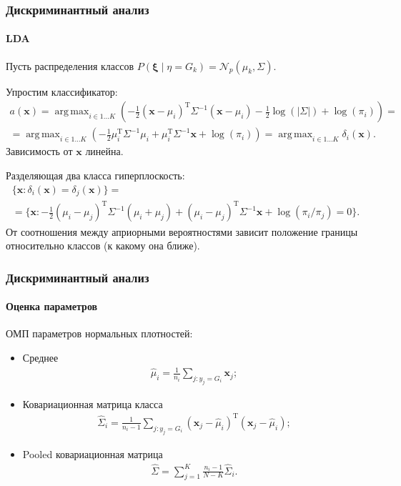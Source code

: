 \documentclass{beamer}
\DeclareMathOperator*{\argmax}{arg\,max}
\begin{document}
\begin{frame}
  \frametitle{Дискриминантный анализ}
  \framesubtitle{LDA}
  Пусть распределения классов $P(\boldsymbol{\xi} \mid \eta = G_k) = \mathcal{N}_p(\mu_k, \Sigma)$.

  Упростим классификатор:
  \begin{multline*}
    a(\mathbf{x})
    = \argmax_{i \in 1 \ldots K}(-\frac{1}{2}(\mathbf{x} - \mu_i)^\mathrm{T} \Sigma^{-1}(\mathbf{x} - \mu_i) - \frac{1}{2}\log(\lvert \Sigma \rvert) + \log(\pi_i)) = \\
    = \argmax_{i \in 1 \ldots K}(-\frac{1}{2} \mu_i^\mathrm{T} \Sigma^{-1}\mu_i + \mu_i^\mathrm{T} \Sigma^{-1}\mathbf{x} + \log(\pi_i)) =  \argmax_{i \in 1 \ldots K} \delta_i(\mathbf{x}).
  \end{multline*}
  Зависимость от $\mathbf{x}$ линейна.

  Разделяющая два класса гиперплоскость:
  \begin{multline*}
    \{\mathbf{x} : \delta_i(\mathbf{x}) = \delta_j(\mathbf{x})\} =\\ = \{\mathbf{x} : -\frac{1}{2} (\mu_i - \mu_j)^\mathrm{T} \Sigma^{-1}(\mu_i + \mu_j) + (\mu_i - \mu_j)^\mathrm{T} \Sigma^{-1}\mathbf{x} + \log(\pi_i/\pi_j) = 0\}.
  \end{multline*}
  От соотношения между априорными вероятностями зависит положение границы относительно классов (к какому она ближе).
\end{frame}
\begin{frame}
  \frametitle{Дискриминантный анализ}
  \framesubtitle{Оценка параметров}
  ОМП параметров нормальных плотностей:

  \begin{itemize}
    \item Среднее \begin{align*}
    \widehat{\mu}_i = \frac{1}{n_i}\sum\limits_{j: y_j = G_i} \mathbf{x}_j;
    \end{align*}
    \item Ковариационная матрица класса
    \begin{align*}
      \widehat{\Sigma}_i = \frac{1}{n_i - 1}\sum_{j: y_j = G_i} (\mathbf{x}_j - \widehat{\mu}_i)^\mathrm{T}(\mathbf{x}_j - \widehat{\mu}_i);
    \end{align*}
    \item Pooled ковариационная матрица
    \begin{align*}
      \widehat{\Sigma}= \sum\limits_{j = 1}^K\frac{n_i - 1}{N - K} \widehat{\Sigma}_i.
    \end{align*}
  \end{itemize}
\end{frame}
\end{document}
